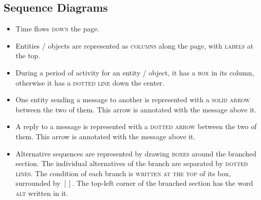 \documentclass[landscape]{cheat}
\begin{document}
\begin{multicols*}{3}
\section{Sequence Diagrams}
\begin{itemize}
    \item Time flows \textsc{down} the page.
    \item Entities / objects are represented as \textsc{columns} along the page, with \textsc{labels} at the top.
    \item During a period of activity for an entity / object, it has a \textsc{box} in its column, otherwise it has a \textsc{dotted line} down the center.
    \item One entity sending a message to another is represented with a \textsc{solid arrow} between the two of them.
        This arrow is annotated with the message above it.
    \item A reply to a message is represented with a \textsc{dotted arrow} between the two of them.
        This arrow is annotated with the message above it.
    \item Alternative sequences are represented by drawing \textsc{boxes} around the branched section.
        The individual alternatives of the branch are separated by \textsc{dotted lines}.
        The condition of each branch is \textsc{written at the top} of its box, surrounded by $[]$.
        The top-left corner of the branched section has the word \textsc{alt} written in it.

\end{itemize}

\end{multicols*}
\end{document}
